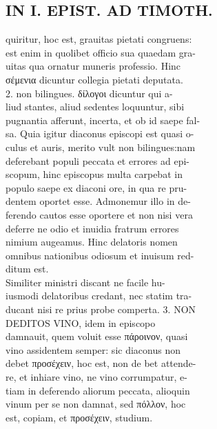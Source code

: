 \documentclass{article}
\begin{document}
\begin{pages}
\section*{IN I. EPIST. AD TIMOTH. \\
                }
quiritur, hoc est, grauitas pietati congruens: \\
                est enim in quolibet officio sua quaedam gra- \\
                uitas qua ornatur muneris professio. Hinc \\
                σέμενια dicuntur collegia pietati deputata. \\
                2. non bilingues. δίλογοι dicuntur qui a- \\
                liud stantes, aliud sedentes loquuntur, sibi \\
                pugnantia afferunt, incerta, et ob id saepe fal- \\
                sa. Quia igitur diaconus episcopi est quasi o- \\
                culus et auris, merito vult non bilingues:nam \\
                deferebant populi peccata et errores ad epi- \\
                scopum, hinc episcopus multa carpebat in \\
                populo saepe ex diaconi ore, in qua re pru- \\
                dentem oportet esse. Admonemur illo in de- \\
                ferendo cautos esse oportere et non nisi vera \\
                deferre ne odio et inuidia fratrum errores \\
                nimium augeamus. Hinc delatoris nomen \\
                omnibus nationibus odiosum et inuisum red- \\
                ditum est. \\
                Similiter ministri discant ne facile hu- \\
                iusmodi delatoribus credant, nec statim tra- \\
                ducant nisi re prius probe comperta. 3. NON \\
                DEDITOS VINO, idem in episcopo \\
                damnauit, quem voluit esse πάροινον, quasi \\
                vino assidentem semper: sic diaconus non \\
                debet προσέχειν, hoc est, non de bet attende- \\
                re, et inhiare vino, ne vino corrumpatur, e- \\
                tiam in deferendo aliorum peccata, alioquin \\
                vinum per se non damnat, sed πόλλον, hoc \\
                est, copiam, et προσέχειν, studium. \\
                

\end{pages}
\end{document}
